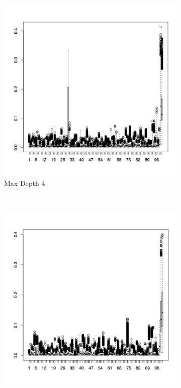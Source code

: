 \documentclass{article}
\begin{document}
\begin{figure}[H]
        \centering
        \begin{subfigure}[b]{0.3\textwidth}
                \centering
                \includegraphics[width=\textwidth]{c4_boxp}
                \caption{Max Depth 4}
                \label{fig:gull}
        \end{subfigure}%
        ~ %
        \begin{subfigure}[b]{0.3\textwidth}
                \centering
                \includegraphics[width=\textwidth]{c5_boxp}

\end{subfigure}
\end{figure}
\end{document}
